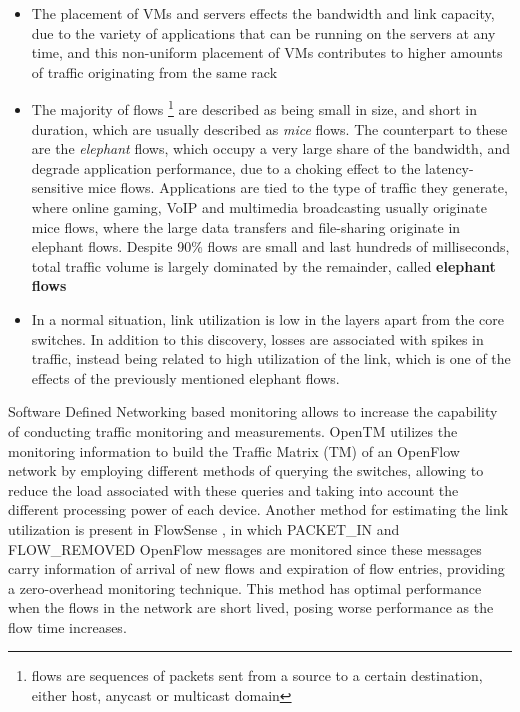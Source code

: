 \begin {itemize}
    \item The placement of VMs and servers effects the bandwidth and link capacity, due to the variety of applications that can be running on the servers at any time,
        and this non-uniform placement of VMs contributes to higher amounts of traffic originating from the same rack
    \item The majority of flows \footnote {flows are sequences of packets sent from a source to a certain destination, either host, anycast or multicast domain} 
        are described as being small in size, and short in duration, which are usually described as \textit {mice} flows. 
        The counterpart to these are the \textit {elephant} flows, which occupy a very large share of the bandwidth, and degrade application performance, due to a
        choking effect to the latency-sensitive mice flows. 
        Applications are tied to the type of traffic they generate, where online gaming, VoIP and multimedia broadcasting usually originate mice flows, where the 
        large data transfers and file-sharing originate in elephant flows. Despite 90\% flows are small and last hundreds of milliseconds, total traffic volume is 
        largely dominated by the remainder, called \textbf{elephant flows} \cite{benson_network_2010}
    \item In a normal situation, link utilization is low in the layers apart from the core switches. In addition to this discovery, losses are associated with 
        spikes in traffic, instead being related to high utilization  of the link, which is one of the effects of the previously mentioned elephant flows.
\end {itemize}

\par Software Defined Networking based monitoring allows to increase the capability of conducting traffic monitoring and measurements. OpenTM 
\cite{opentm_traffic_estimator} utilizes the monitoring information to build the Traffic Matrix (TM) of an OpenFlow network by employing different methods of 
querying the switches, allowing to reduce the load associated with these queries and taking into account the different processing power of each device. Another 
method for estimating the link utilization is present in FlowSense \cite{flowsense_network_utilization}, in which PACKET\_IN and FLOW\_REMOVED OpenFlow messages 
are monitored since these messages carry information of arrival of new flows and expiration of flow entries, providing a zero-overhead monitoring technique. This 
method has optimal performance when the flows in the network are short lived, posing worse performance as the flow time increases.

